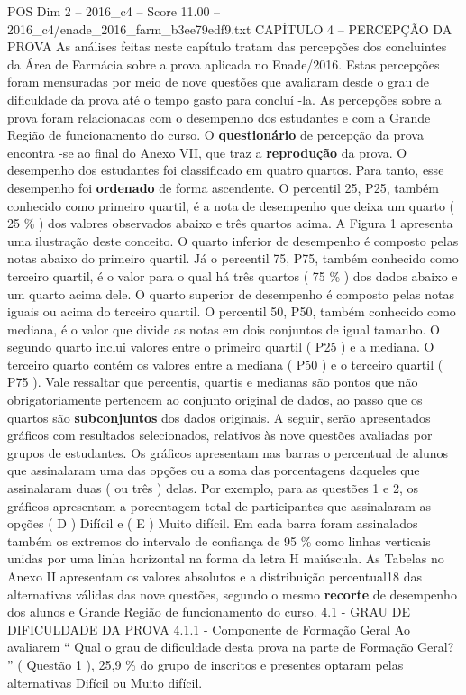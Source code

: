 \begin{textsample}{POS Dim 2 – 2016\_c4 – Score 11.00 – 2016\_c4/enade\_2016\_farm\_b3ee79edf9.txt}  \label{ex:f2_pos_076}
CAPÍTULO 4 – PERCEPÇÃO DA PROVA As análises feitas neste capítulo tratam das percepções dos concluintes da Área de Farmácia sobre a prova aplicada no Enade/2016.
Estas percepções foram mensuradas por meio de nove questões que avaliaram desde o grau de dificuldade da prova até o tempo gasto para concluí -la.
As percepções sobre a prova foram relacionadas com o desempenho dos estudantes e com a Grande Região de funcionamento do curso.
O \textbf{questionário} de percepção da prova encontra -se ao final do Anexo VII, que traz a \textbf{reprodução} da prova.
O desempenho dos estudantes foi classificado em quatro quartos.
Para tanto, esse desempenho foi \textbf{ordenado} de forma ascendente.
O percentil 25, P25, também conhecido como primeiro quartil, é a nota de desempenho que deixa um quarto ( 25 \% ) dos valores observados abaixo e três quartos acima.
A Figura 1 apresenta uma ilustração deste conceito.
O quarto inferior de desempenho é composto pelas notas abaixo do primeiro quartil.
Já o percentil 75, P75, também conhecido como terceiro quartil, é o valor para o qual há três quartos ( 75 \% ) dos dados abaixo e um quarto acima dele.
O quarto superior de desempenho é composto pelas notas iguais ou acima do terceiro quartil.
O percentil 50, P50, também conhecido como mediana, é o valor que divide as notas em dois conjuntos de igual tamanho.
O segundo quarto inclui valores entre o primeiro quartil ( P25 ) e a mediana.
O terceiro quarto contém os valores entre a mediana ( P50 ) e o terceiro quartil ( P75 ).
Vale ressaltar que percentis, quartis e medianas são pontos que não obrigatoriamente pertencem ao conjunto original de dados, ao passo que os quartos são \textbf{subconjuntos} dos dados originais.
A seguir, serão apresentados gráficos com resultados selecionados, relativos às nove questões avaliadas por grupos de estudantes.
Os gráficos apresentam nas barras o percentual de alunos que assinalaram uma das opções ou a soma das porcentagens daqueles que assinalaram duas ( ou três ) delas.
Por exemplo, para as questões 1 e 2, os gráficos apresentam a porcentagem total de participantes que assinalaram as opções ( D ) Difícil e ( E ) Muito difícil.
Em cada barra foram assinalados também os extremos do intervalo de confiança de 95 \% como linhas verticais unidas por uma linha horizontal na forma da letra H maiúscula.
As Tabelas no Anexo II apresentam os valores absolutos e a distribuição percentual18 das alternativas válidas das nove questões, segundo o mesmo \textbf{recorte} de desempenho dos alunos e Grande Região de funcionamento do curso. 4.1 - GRAU DE DIFICULDADE DA PROVA 4.1.1 - Componente de Formação Geral Ao avaliarem “ Qual o grau de dificuldade desta prova na parte de Formação Geral? ” ( Questão 1 ), 25,9 \% do grupo de inscritos e presentes optaram pelas alternativas Difícil ou Muito difícil.

\end{textsample}
